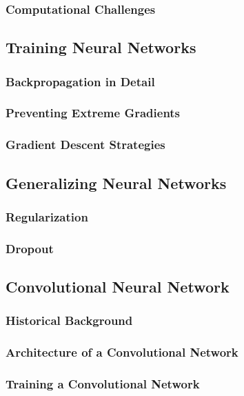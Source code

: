 \documentclass[titlepage]{article}
\begin{document}
\subsubsection{Computational Challenges}

\newpage

\subsection{Training Neural Networks}
\subsubsection{Backpropagation in Detail}
\subsubsection{Preventing Extreme Gradients}
\subsubsection{Gradient Descent Strategies}

\newpage

\subsection{Generalizing Neural Networks}
\subsubsection{Regularization}
\subsubsection{Dropout}

\newpage

\subsection{Convolutional Neural Network}
\subsubsection{Historical Background}
\subsubsection{Architecture of a Convolutional Network}
\subsubsection{Training a Convolutional Network}
\end{document}
